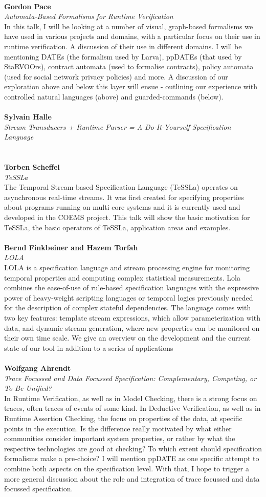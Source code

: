 \documentclass{article}
\newcounter{talkc}
\newcommand{\talk}[3]{\stepcounter{talkc}
\vspace{0.5em}~\\
\noindent
\textbf{#1}\\ 
\noindent\emph{#2}\\ 
\noindent#3\\
}
\begin{document}
%
\talk{Gordon Pace}{Automata-Based Formalisms for Runtime Verification}{In this talk, I will be looking at a number of visual, graph-based formalisms we have used in various projects and domains, with a particular focus on their use in runtime verification. A discussion of their use in different domains. I will be mentioning DATEs (the formalism used by Larva), ppDATEs (that used by StaRVOOrs), contract automata (used to formalise contracts), policy automata (used for social network privacy policies) and more. A discussion of our exploration above and below this layer will ensue - outlining our experience with controlled natural languages (above) and guarded-commands (below).}
%
\talk{Sylvain Halle}{Stream Transducers + Runtime Parser = A Do-It-Yourself Specification Language}{}
%
\talk{Torben Scheffel}{TeSSLa}{The Temporal Stream-based Specification Language (TeSSLa) operates on asynchronous real-time streams. It was first created for specifying properties about programs running on multi core systems and it is currently used and developed in the COEMS project. This talk will show the basic motivation for TeSSLa, the basic operators of TeSSLa, application areas and examples.}
%
\talk{Bernd Finkbeiner and Hazem Torfah}{LOLA}{LOLA is a specification language and stream processing engine for monitoring temporal properties and computing complex statistical measurements. Lola combines the ease-of-use of rule-based specification languages with the expressive power of heavy-weight scripting languages or temporal logics previously needed for the description of complex stateful dependencies. The language comes with two key features: template stream expressions, which allow parameterization with data, and dynamic stream generation, where new properties can be monitored on their own time scale. We give an overview on the development and the current state of our tool in addition to a series of applications}
%
\talk{Wolfgang Ahrendt}{Trace Focussed and Data Focussed Specification: Complementary, Competing, or To Be Unified?}{In Runtime Verification, as well as in Model Checking, there is a strong focus on traces, often traces of events of some kind. In Deductive Verification, as well as in Runtime Assertion Checking, the focus on properties of the data, at specific points in the execution. Is the difference really motivated by what either communities consider important system properties, or rather by what the respective technologies are good at checking? To which extent should specification formalisms make a pre-choice? I will mention ppDATE as one specific attempt to combine both aspects on the specification level. With that, I hope to trigger a more general discussion about the role and integration of trace focussed and data focussed specification.}
%
\end{document}
